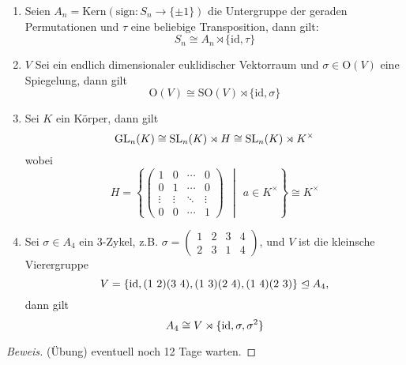 \documentclass[a4paper]{report}
\begin{document}
\begin{bspe*}\item
  \begin{enumerate}[1.]
    \item Seien $A_{n} = \mathrm{Kern}(\mathrm{sign}: S_{n} \to \{\pm1\})$ die Untergruppe der geraden Permutationen und $\tau$ eine beliebige Transposition, dann gilt:
          $$S_{n} \cong A_{n} \rtimes \{\mathrm{id}, \tau\}$$
    \item $V$ Sei ein endlich dimensionaler euklidischer Vektorraum und $\sigma \in \mathrm{O}(V)$ eine Spiegelung, dann gilt
          $$\mathrm O(V) \cong \mathrm{SO}(V) \rtimes \{\mathrm{id}, \sigma\}$$
    \item Sei $K$ ein Körper, dann gilt
          $$\operatorname{GL}_{n}(K) \cong \operatorname{SL}_{n}(K) \rtimes H \cong \mathrm{SL}_{n}(K) \rtimes K^{\times}$$
          wobei
          \[H = \left\{ \begin{pmatrix}
                          1 &0&\cdots& 0 \\
                          0 & 1&\cdots & 0\\
                          \vdots &\vdots & \ddots& \vdots\\
                          0 & 0& \cdots& 1
                        \end{pmatrix} \ \ \middle\vert\ \  a \in K^{\times}\right\} \cong K^{\times}
          \]
    \item Sei $\sigma \in A_{4}$ ein 3-Zykel, z.B. $\sigma = \begin{pmatrix} 1 & 2 & 3 & 4 \\ 2 & 3 & 1 & 4 \end{pmatrix}$, und $V$ ist die kleinsche Vierergruppe
          $$V = \{\operatorname{id}, (1\ 2)(3\ 4), (1\ 3)(2\ 4), (1\ 4)(2\ 3)\} \trianglelefteq A_{4},$$
          dann gilt $$A_{4} \cong V \rtimes \{\operatorname{id}, \sigma, \sigma^{2}\}$$
  \end{enumerate}
  \begin{proof}[Beweis] (Übung) eventuell noch 12 Tage warten.
  \end{proof}
\end{bspe*}
\end{document}
